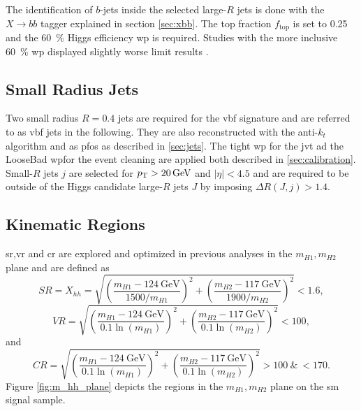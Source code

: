 
The identification of $b$-jets inside the selected large-$R$ jets is done with the $X\rightarrow bb$ tagger explained in section \ref{sec:xbb}. The top fraction $f_\text{top}$ is set to 0.25 and the \qty[]{60}{\percent} Higgs efficiency \ac{wp} is required. Studies with the more inclusive \qty[]{60}{\percent} \ac{wp} displayed slightly worse limit results \citep{ATL-COM-PHYS-2023-033}.

\subsection{Small Radius Jets}
Two small radius $R=0.4$ jets are required for the \ac{vbf} signature and are referred to as \ac{vbf} jets in the following. They are also reconstructed with the anti-$k_t$ algorithm and as \acp{pfo} as described in \ref{sec:jets}. The tight \ac{wp} for the \ac{jvt} ad the LooseBad \ac{wp}for the event cleaning are applied both described in \ref{sec:calibration}. Small-$R$ jets $j$ are selected for $p_{\text{T}}>\qty[]{20}{GeV}$ and $|\eta|<4.5$ and are required to be outside of the Higgs candidate large-$R$ jets $J$ by imposing $\Delta R(J,j) > 1.4$. 

\subsection{Kinematic Regions}\label{sec:kinematic_regions}
\ac{sr},\ac{vr} and \ac{cr} are explored and optimized in previous analyses \citep{aad2023search,ATL-COM-PHYS-2023-033} in the $m_{H1},m_{H2}$ plane and are defined as
\begin{equation}
    SR=X_{hh} =  \sqrt{\left(\frac{m_{H1} - \SI{124}{\GeV}}{1500 / m_{H1}}\right)^{2} + \left(\frac{m_{H2} - \SI{117}{\GeV}}{1900 / m_{H2}}\right)^{2}} < 1.6,
\end{equation}
\begin{equation}
    \label{VR_Xhh}
    VR =  \sqrt{\left(\frac{m_{H1} - \SI{124}{\GeV}}{0.1 \ln(m_{H1})}\right)^{2} + \left(\frac{m_{H2} - \SI{117}{\GeV}}{0.1 \ln(m_{H2})}\right)^{2}} < 100,
\end{equation}
and
\begin{equation}
    \label{CR_Xhh}
    CR = \sqrt{\left(\frac{m_{H1} - \SI{124}{\GeV}}{0.1 \ln(m_{H1})}\right)^{2} + \left(\frac{m_{H2} - \SI{117}{\GeV}}{0.1 \ln(m_{H2})}\right)^{2}} > 100  \ \& \ < 170.
\end{equation}
Figure \ref{fig:m_hh_plane} depicts the regions in the $m_{H1},m_{H2}$ plane on the \ac{sm} signal sample.

